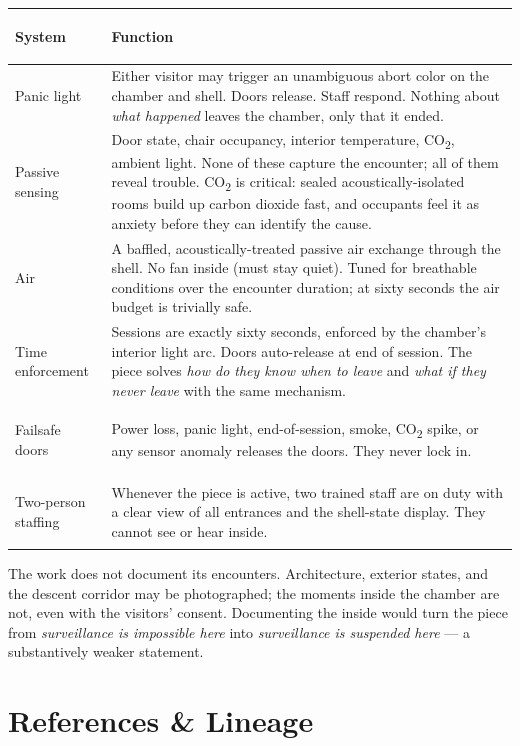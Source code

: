 \documentclass[10pt, letterpaper]{article}
\begin{document}
\begin{tabularx}{\textwidth}{@{} >{\bfseries\raggedright\arraybackslash}p{2.4cm} X @{}}
\toprule
\textbf{System} & \textbf{Function} \\
\midrule
Panic light & Either visitor may trigger an unambiguous abort color on the chamber and shell. Doors release. Staff respond. Nothing about \textit{what happened} leaves the chamber, only that it ended. \\
Passive sensing & Door state, chair occupancy, interior temperature, CO\textsubscript{2}, ambient light. None of these capture the encounter; all of them reveal trouble. CO\textsubscript{2} is critical: sealed acoustically-isolated rooms build up carbon dioxide fast, and occupants feel it as anxiety before they can identify the cause. \\
Air & A baffled, acoustically-treated passive air exchange through the shell. No fan inside (must stay quiet). Tuned for breathable conditions over the encounter duration; at sixty seconds the air budget is trivially safe. \\
Time enforcement & Sessions are exactly sixty seconds, enforced by the chamber's interior light arc. Doors auto-release at end of session. The piece solves \textit{how do they know when to leave} and \textit{what if they never leave} with the same mechanism. \\
Failsafe doors & Power loss, panic light, end-of-session, smoke, CO\textsubscript{2} spike, or any sensor anomaly releases the doors. They never lock in. \\
Two-person staffing & Whenever the piece is active, two trained staff are on duty with a clear view of all entrances and the shell-state display. They cannot see or hear inside. \\
\bottomrule
\end{tabularx}

The work does not document its encounters. Architecture, exterior states, and the descent corridor may be photographed; the moments inside the chamber are not, even with the visitors' consent. Documenting the inside would turn the piece from \textit{surveillance is impossible here} into \textit{surveillance is suspended here} --- a substantively weaker statement.

\section{References \& Lineage}
\end{document}

